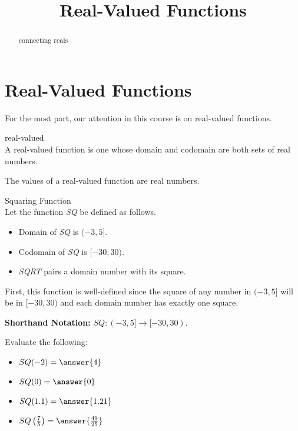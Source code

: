 \documentclass{ximera}
\title{Real-Valued Functions}
\begin{document}
\begin{abstract}
connecting reals
\end{abstract}
\maketitle




\section{Real-Valued Functions}

For the most part, our attention in this course is on real-valued functions.




\begin{definition} real-valued \\

A real-valued function is one whose domain and codomain are both sets of real numbers.

\end{definition}
The values of a real-valued function are real numbers.







\begin{example} Squaring Function \\

Let the function \textit{SQ} be defined as follows.


\begin{itemize}
\item Domain of \textit{SQ} is $(-3, 5]$.
\item Codomain of \textit{SQ} is $[-30, 30)$.
\item \textit{SQRT} pairs a domain number with its square.
\end{itemize}


First, this function is well-defined since the square of any number in $(-3, 5]$ will be in $[-30, 30)$ and each domain number has exactly one square.


\textbf{Shorthand Notation: } $SQ: (-3, 5] \rightarrow [-30, 30)$.

\begin{question}
Evaluate the following:

\begin{itemize}
	\item $SQ(-2) = \answer{4}$
	\item $SQ(0) = \answer{0}$
	\item $SQ(1.1) = \answer{1.21}$
	\item $SQ\left(\frac{7}{5}\right) = \answer{\frac{49}{25}}$
\end{itemize}

\end{question}

\end{example}
\end{document}
